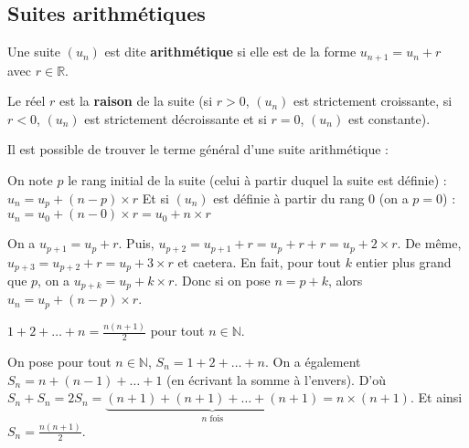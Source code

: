 	\subsection{Suites arithmétiques}

	\begin{formula}[Définition]
		Une suite $(u_n)$ est dite \textbf{arithmétique} si elle est de la forme $u_{n+1} = u_n + r$ avec $r \in \mathbb{R}$.
	\end{formula}

	\begin{formula}[Raison]
		Le réel $r$ est la \textbf{raison} de la suite (si $r \gt 0$, $(u_n)$ est strictement croissante, si $r \lt 0$, $(u_n)$ est strictement décroissante et si $r = 0$, $(u_n)$ est constante).
	\end{formula}

	Il est possible de trouver le terme général d'une suite arithmétique :

	\begin{formula}
		On note $p$ le rang initial de la suite (celui à partir duquel la suite est définie) :
		\newpar
		$u_n = u_p + (n-p) \times r$
		\newpar
		Et si $(u_n)$ est définie à partir du rang $0$ (on a $p = 0$) :
		\newpar
		$u_n = u_0 + (n-0) \times r = u_0 + n \times r$
	\end{formula}

	\begin{demonstration}
		On a $u_{p+1} = u_p + r$. Puis, $u_{p+2} = u_{p+1} + r = u_p + r + r = u_p + 2 \times r$. De même, $u_{p+3} = u_{p+2} + r = u_p + 3 \times r$  et caetera.
		\newline
		En fait, pour tout $k$ entier plus grand que $p$, on a $u_{p+k} = u_p + k \times r$.
		\newline
		Donc si on pose $n = p+k$, alors $u_n = u_p + (n-p) \times r$.
	\end{demonstration}

	\begin{formula}
		$\displaystyle{1 + 2 + \dots + n = \frac{n(n + 1)}{2}}$ pour tout $n \in \mathbb{N}$.
	\end{formula}

	\begin{demonstration}
		On pose pour tout $n \in \mathbb{N}$, $S_n = 1 + 2 + \dots + n$. On a également $S_n = n + (n-1) + \dots + 1$ (en écrivant la somme à l'envers).
		\newline
		D'où $S_n + S_n = 2S_n = \underbrace{(n + 1) + (n + 1) + \dots + (n + 1)}_{n \text{ fois}} = n \times (n + 1)$. Et ainsi $\displaystyle{S_n = \frac{n(n + 1)}{2}}$.
	\end{demonstration}

